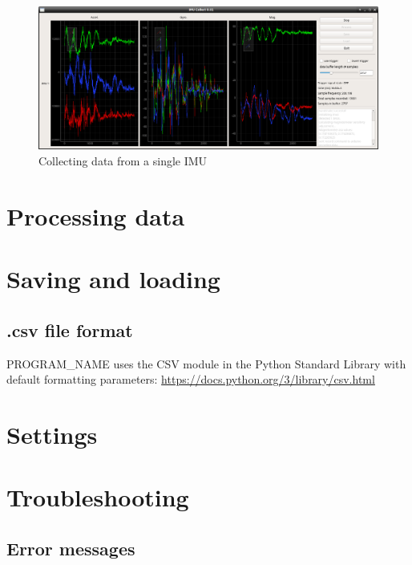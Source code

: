 \documentclass[11pt,letterpaper,article,oneside]{memoir}
\newcommand{\name}{PROGRAM\_NAME}
\begin{document}
\begin{figure}[]
    \begin{center}
        \includegraphics[width=.45\textwidth]{screenshot_1_imu}
    \end{center}
    \caption{Collecting data from a single IMU} 
\end{figure}





\section{Processing data}

\section{Saving and loading}
\label{sec:savingloading}

\subsection{.csv file format}
\label{sec:csv}
\name{} uses the CSV module in the Python Standard Library
with default formatting parameters:
\url{https://docs.python.org/3/library/csv.html}

\section{Settings}

\section{Troubleshooting}

\subsection{Error messages}
\end{document}
